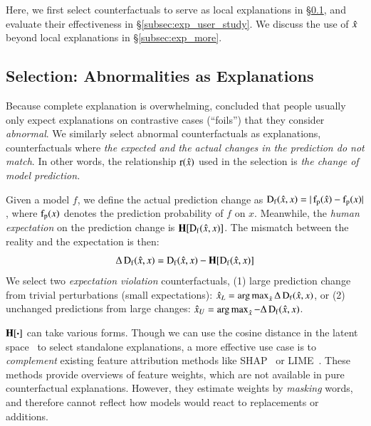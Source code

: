 %

Here, we first select counterfactuals to serve as local explanations in \S\ref{subsec:local_explain}, and evaluate their effectiveness in \S\ref{subsec:exp_user_study}.
We discuss the use of $\hat{x}$ beyond local explanations in \S\ref{subsec:exp_more}.

\subsection{Selection: Abnormalities as Explanations}
\label{subsec:local_explain}


Because complete explanation is overwhelming, \citet{miller} concluded that people usually only expect explanations on contrastive cases (``foils'') that they consider \emph{abnormal}.
We similarly select abnormal counterfactuals as explanations, \ie counterfactuals where \emph{the expected and the actual changes in the prediction do not match}.
In other words, the relationship $\operatorname*{r}(\hat{x})$ used in the selection is \emph{the change of model prediction.}

Given a model $f$, we define the actual prediction change as $\operatorname*{D_f}(\hat{x}, x)=|\operatorname*{f_p}(\hat{x})-\operatorname*{f_p}(x)|$, where $\operatorname*{f_p}(x)$ denotes the prediction probability of $f$ on $x$.
Meanwhile, the \emph{human expectation} on the prediction change is $\operatorname*{\mathbf{H}}[\operatorname*{D_f}(\hat{x}, x)]$.
The mismatch between the reality and the expectation is then:
$$\Delta\operatorname*{D_f}(\hat{x}, x) = \operatorname*{D_f}(\hat{x}, x)-\operatorname*{\mathbf{H}}[\operatorname*{D_f}(\hat{x}, x)]$$
We select two \emph{expectation violation} counterfactuals, \ie (1) large prediction change from trivial perturbations (small expectations): $\hat{x}_L = \operatorname*{arg\,max}_{\hat{x}} \Delta\operatorname*{D_f}(\hat{x}, x)$, or (2) unchanged predictions from large changes: $\hat{x}_U = \operatorname*{arg\,max}_{\hat{x}} -\Delta\operatorname*{D_f}(\hat{x}, x)$. 

$\operatorname*{\mathbf{H}}[\boldsymbol{\cdot}]$ can take various forms.
Though we can use the cosine distance in the latent space~\cite{reimers-2019-sentence-bert} to select standalone explanations, a more effective use case is to \emph{complement} existing feature attribution methods like SHAP~\cite{NIPS2017_7062} or LIME~\cite{Ribeiro2016WhySI}.
These methods provide overviews of feature weights, which are not available in pure counterfactual explanations.
However, they estimate weights by \emph{masking} words, and therefore cannot reflect how models would react to replacements or additions.

